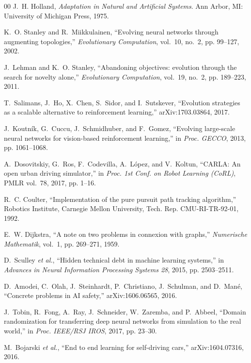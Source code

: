 \documentclass[conference]{IEEEtran}
\begin{document}
\begin{thebibliography}{00}
J.~H. Holland, \emph{Adaptation in Natural and Artificial Systems}. Ann Arbor, MI: University of Michigan Press, 1975.

K.~O. Stanley and R.~Miikkulainen, ``Evolving neural networks through augmenting topologies,'' \emph{Evolutionary Computation}, vol.~10, no.~2, pp. 99--127, 2002.

J.~Lehman and K.~O. Stanley, ``Abandoning objectives: evolution through the search for novelty alone,'' \emph{Evolutionary Computation}, vol.~19, no.~2, pp. 189--223, 2011.

T.~Salimans, J.~Ho, X.~Chen, S.~Sidor, and I.~Sutskever, ``Evolution strategies as a scalable alternative to reinforcement learning,'' arXiv:1703.03864, 2017.

J.~Koutn\'ik, G.~Cuccu, J.~Schmidhuber, and F.~Gomez, ``Evolving large-scale neural networks for vision-based reinforcement learning,'' in \emph{Proc. GECCO}, 2013, pp. 1061--1068.

A.~Dosovitskiy, G.~Ros, F.~Codevilla, A.~L\'opez, and V.~Koltun, ``CARLA: An open urban driving simulator,'' in \emph{Proc. 1st Conf. on Robot Learning (CoRL)}, PMLR vol.~78, 2017, pp. 1--16.

R.~C. Coulter, ``Implementation of the pure pursuit path tracking algorithm,'' Robotics Institute, Carnegie Mellon University, Tech. Rep. CMU-RI-TR-92-01, 1992.

E.~W. Dijkstra, ``A note on two problems in connexion with graphs,'' \emph{Numerische Mathematik}, vol.~1, pp. 269--271, 1959.

D.~Sculley \emph{et al.}, ``Hidden technical debt in machine learning systems,'' in \emph{Advances in Neural Information Processing Systems 28}, 2015, pp. 2503--2511.

D.~Amodei, C.~Olah, J.~Steinhardt, P.~Christiano, J.~Schulman, and D.~Man\'e, ``Concrete problems in AI safety,'' arXiv:1606.06565, 2016.

J.~Tobin, R.~Fong, A.~Ray, J.~Schneider, W.~Zaremba, and P.~Abbeel, ``Domain randomization for transferring deep neural networks from simulation to the real world,'' in \emph{Proc. IEEE/RSJ IROS}, 2017, pp. 23--30.

M.~Bojarski \emph{et al.}, ``End to end learning for self-driving cars,'' arXiv:1604.07316, 2016.


\end{thebibliography}
\end{document}
